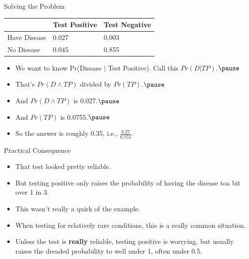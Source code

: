 \documentclass[
  ignorenonframetext,
]{beamer}
\providecommand{\tightlist}{%
  \setlength{\itemsep}{0pt}\setlength{\parskip}{0pt}}
\renewcommand{\,}{\text{, }}
\begin{document}
\begin{frame}{Solving the Problem}
\protect\hypertarget{solving-the-problem}{}

\begin{longtable}[]{@{}lll@{}}
\toprule
& Test Positive & Test Negative\tabularnewline
\midrule
\endhead
Have Disease & 0.027 & 0.003\tabularnewline
No Disease & 0.045 & 0.855\tabularnewline
\bottomrule
\end{longtable}

\begin{itemize}
\tightlist
\item
  We want to know Pr(Disease \(|\) Test Positive). Call this
  \(Pr(D | TP)\).\(\pause\)
\item
  That's \(Pr(D \wedge TP)\) divided by \(Pr(TP)\).\(\pause\)
\item
  And \(Pr(D \wedge TP)\) is 0.027.\(\pause\)
\item
  And \(Pr(TP)\) is 0.0755.\(\pause\)
\item
  So the answer is roughly 0.35, i.e., \(\frac{0.27}{0.755}\).
\end{itemize}

\end{frame}

\begin{frame}{Practical Consequence}
\protect\hypertarget{practical-consequence}{}

\begin{itemize}
\tightlist
\item
  That test looked pretty reliable.
\item
  But testing positive only raises the probability of having the disease
  toa bit over 1 in 3.
\item
  This wasn't really a quirk of the example.
\item
  When testing for relatively rare conditions, this is a really common
  situation.
\item
  Unless the test is \textbf{really} reliable, testing positive is
  worrying, but usually raises the dreaded probability to well under 1,
  often under 0.5.
\end{itemize}

\end{frame}
\end{document}
